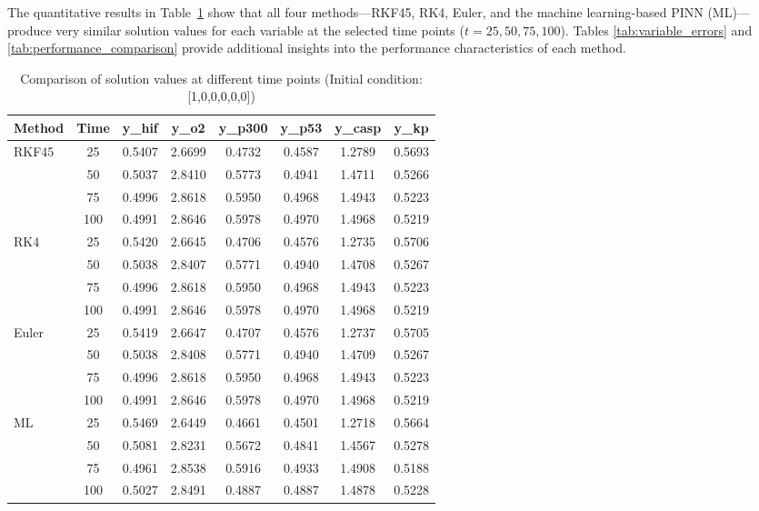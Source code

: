 \documentclass[conference]{IEEEtran}
\begin{document}
The quantitative results in Table~\ref{tab:time_point_comparison} show that all four methods—RKF45, RK4, Euler, and the machine learning-based PINN (ML)—produce very similar solution values for each variable at the selected time points ($t=25, 50, 75, 100$). Tables \ref{tab:variable_errors} and \ref{tab:performance_comparison} provide additional insights into the performance characteristics of each method.

\vspace{\bigskipamount}
\begin{table}[htbp]
\centering
\caption{Comparison of solution values at different time points (Initial condition: [1,0,0,0,0,0])}
\begin{tabular}{lccccccc}
\toprule
\textbf{Method} & \textbf{Time} & \textbf{y\_hif} & \textbf{y\_o2} & \textbf{y\_p300} & \textbf{y\_p53} & \textbf{y\_casp} & \textbf{y\_kp} \\
\midrule
RKF45 & 25  & 0.5407 & 2.6699 & 0.4732 & 0.4587 & 1.2789 & 0.5693 \\
      & 50  & 0.5037 & 2.8410 & 0.5773 & 0.4941 & 1.4711 & 0.5266 \\
      & 75  & 0.4996 & 2.8618 & 0.5950 & 0.4968 & 1.4943 & 0.5223 \\
      & 100 & 0.4991 & 2.8646 & 0.5978 & 0.4970 & 1.4968 & 0.5219 \\
\midrule
RK4   & 25  & 0.5420 & 2.6645 & 0.4706 & 0.4576 & 1.2735 & 0.5706 \\
      & 50  & 0.5038 & 2.8407 & 0.5771 & 0.4940 & 1.4708 & 0.5267 \\
      & 75  & 0.4996 & 2.8618 & 0.5950 & 0.4968 & 1.4943 & 0.5223 \\
      & 100 & 0.4991 & 2.8646 & 0.5978 & 0.4970 & 1.4968 & 0.5219 \\
\midrule
Euler & 25  & 0.5419 & 2.6647 & 0.4707 & 0.4576 & 1.2737 & 0.5705 \\
      & 50  & 0.5038 & 2.8408 & 0.5771 & 0.4940 & 1.4709 & 0.5267 \\
      & 75  & 0.4996 & 2.8618 & 0.5950 & 0.4968 & 1.4943 & 0.5223 \\
      & 100 & 0.4991 & 2.8646 & 0.5978 & 0.4970 & 1.4968 & 0.5219 \\
\midrule
ML    & 25  & 0.5469 & 2.6449 & 0.4661 & 0.4501 & 1.2718 & 0.5664 \\
      & 50  & 0.5081 & 2.8231 & 0.5672 & 0.4841 & 1.4567 & 0.5278 \\
      & 75  & 0.4961 & 2.8538 & 0.5916 & 0.4933 & 1.4908 & 0.5188 \\
      & 100 & 0.5027 & 2.8491 & 0.4887 & 0.4887 & 1.4878 & 0.5228 \\
\bottomrule
\end{tabular}
\label{tab:time_point_comparison}
\end{table}
\end{document}
